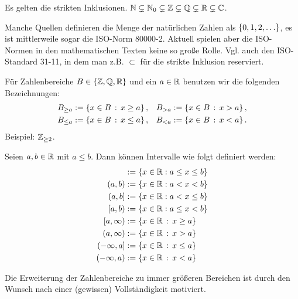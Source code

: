 \begin{bem}
	Es gelten die strikten Inklusionen. 
$ \mathbb{N} \subsetneq \mathbb{N}_0 \subsetneq \mathbb{Z} \subsetneq \mathbb{Q} \subsetneq \mathbb{R} \subsetneq \mathbb{C} $. 
 \end{bem} 

\begin{bem}
	Manche Quellen definieren die Menge der natürlichen Zahlen als $ \left\{ 0,1,2,\ldots \right\} $, es ist mittlerweile sogar die ISO-Norm 80000-2. Aktuell spielen aber die ISO-Normen in den mathematischen Texten keine so große Rolle. Vgl. auch den ISO-Standard 31-11, in dem man z.B. $\subset$ für die strikte Inklusion reserviert. 
\end{bem}


\begin{bem}
	Für Zahlenbereiche $B  \in \{\mathbb{Z},  \mathbb{Q}, \mathbb{R}\}$ und ein $a \in \mathbb{R}$ benutzen wir die folgenden Bezeichnungen:
	\begin{align*}
			B_{\ge a}&  := \left\{ x \in B \,:\, x \ge a \right\},  &  B_{>a} & := \left\{ x \in B \,:\, x > a \right\}, 
			\\ B_{\le a} & := \left\{ x \in B \,:\, x \le a \right\}, &  B_{<a} & := \left\{ x \in B \,:\, x < a \right\}. 
	\end{align*} 
	Beispiel: $\mathbb{Z}_{\ge 2}$. 
\end{bem} 


\begin{bem}[Intervalle]
	Seien $ a,b \in \mathbb{R} $ mit $ a \leq b $. Dann können Intervalle wie folgt definiert werden:
	\begin{align*}
		[a,b] &:= \{ x \in \R : a \leq x \leq b \}\\
		(a,b) &:= \{ x \in \R : a < x < b \}\\
		(a,b] &:= \{ x \in \R : a < x \leq b \}\\
		[a,b) &:= \{ x \in \R : a \leq x < b \} \\
		[a,\infty) & := \setcond{x \in \R}{x \ge a} \\
		(a,\infty) &:= \setcond{x \in \R}{x > a} \\ 
		(-\infty,a] &:= \setcond{x \in \R}{x \le a} \\
		(-\infty,a) &:= \setcond{x \in \R}{x < a}
	\end{align*}
\end{bem}


\begin{bem}
		Die Erweiterung der  Zahlenbereiche zu immer größeren Bereichen ist durch den Wunsch nach einer (gewissen) Vollständigkeit motiviert.
\end{bem} 


